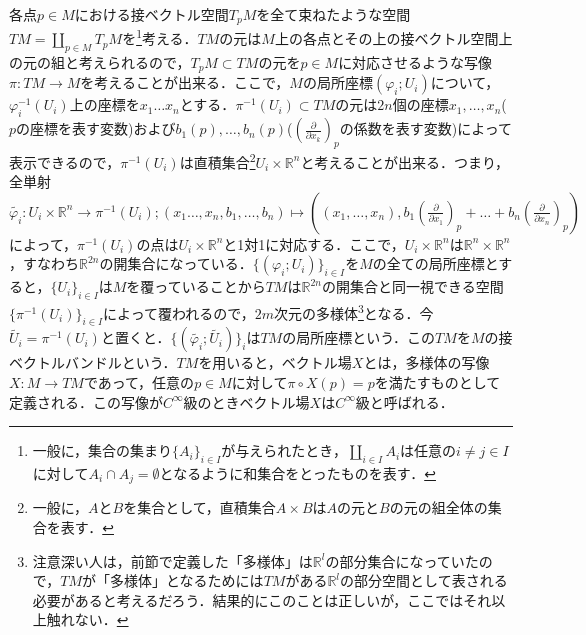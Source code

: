 \documentclass{jsarticle}
\def\realnum{{\mathbb R}}
\def\dfrac{\displaystyle\frac}
\def\delxop{\left(\dfrac{\partial}{\partial x_1}\right)_p}
\def\delxkp{\left(\dfrac{\partial}{\partial x_k}\right)_p}
\def\delxnp{\left(\dfrac{\partial}{\partial x_n}\right)_p}
\begin{document}
各点$p\in M$における接ベクトル空間$T_pM$を全て束ねたような空間$TM=\coprod_{p\in M}T_pM$を\footnote{一般に，集合の集まり$\{A_i\}_{i\in I}$が与えられたとき，$\coprod_{i\in I}A_i$は任意の$i\neq j\in I$に対して$A_i\cap A_j=\emptyset$となるように和集合をとったものを表す．}考える．$TM$の元は$M$上の各点とその上の接ベクトル空間上の元の組と考えられるので，$T_pM\subset TM$の元を$p\in M$に対応させるような写像$\pi:TM\rightarrow M$を考えることが出来る．ここで，$M$の局所座標$(\varphi_i;U_i)$について，$\varphi_i^{-1}(U_i)$上の座標を$x_1\dots x_n$とする．$\pi^{-1}(U_i)\subset TM$の元は$2n$個の座標$x_1,\dots,x_n$($p$の座標を表す変数)および$b_1(p),\dots,b_n(p)$($\delxkp$の係数を表す変数)によって表示できるので，$\pi^{-1}(U_i)$は直積集合\footnote{一般に，$A$と$B$を集合として，直積集合$A\times B$は$A$の元と$B$の元の組全体の集合を表す．}$U_i\times \realnum^n$と考えることが出来る．つまり，全単射$\tilde{\varphi_i}:U_i\times \realnum^n\rightarrow\pi^{-1}(U_i);(x_1\dots,x_n,b_1,\dots,b_n)\mapsto ((x_1,\dots,x_n),b_1\delxop+\dots+b_n\delxnp)$によって，$\pi^{-1}(U_i)$の点は$U_i\times\realnum^n$と1対1に対応する．ここで，$U_i\times \realnum^n$は$\realnum^n\times \realnum^n$，すなわち$\realnum^{2n}$の開集合になっている．$\{(\varphi_i;U_i)\}_{i\in I}$を$M$の全ての局所座標とすると，$\{U_i\}_{i\in I}$は$M$を覆っていることから$TM$は$\realnum^{2n}$の開集合と同一視できる空間$\{\pi^{-1}(U_i)\}_{i\in I}$によって覆われるので，$2m$次元の多様体\footnote{注意深い人は，前節で定義した「多様体」は$\realnum^l$の部分集合になっていたので，$TM$が「多様体」となるためには$TM$がある$\realnum^l$の部分空間として表される必要があると考えるだろう．結果的にこのことは正しいが，ここではそれ以上触れない．}となる．今$\tilde{U_i}=\pi^{-1}(U_i)$と置くと．$\{(\tilde{\varphi_i};\tilde{U_i})\}_i$は$TM$の局所座標という．この$TM$を$M$の接ベクトルバンドルという．$TM$を用いると，ベクトル場$X$とは，多様体の写像$X:M\rightarrow TM$であって，任意の$p\in M$に対して$\pi\circ X(p) = p$を満たすものとして定義される．この写像が$C^{\infty}$級のときベクトル場$X$は$C^{\infty}$級と呼ばれる．
\end{document}
